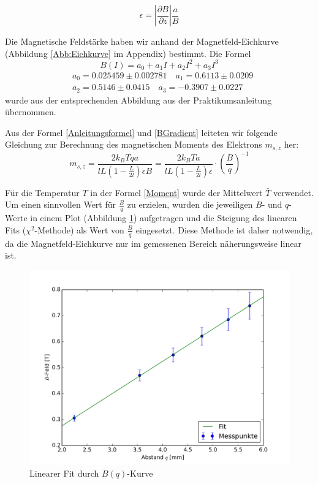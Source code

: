 \documentclass[a4paper,parskip,11pt, DIV12]{scrreprt}
\begin{document}
\begin{equation} \label{BGradient}
\epsilon = \left|\frac{\partial B}{\partial z}\right| \frac{a}{B}
\end{equation}

Die Magnetische Feldstärke haben wir anhand der Magnetfeld-Eichkurve (Abbildung \ref{Abb:Eichkurve} im Appendix) bestimmt. Die Formel \begin{equation}
B(I) = a_0 + a_1 I + a_2 I^2 + a_3 I^3
\end{equation} \begin{align*}
&a_0 = 0.025459 \pm 0.002781 \quad
a_1 = 0.6113 \pm 0.0209 \\ 
&a_2 = 0.5146 \pm 0.0415 \quad
a_3 = -0.3907 \pm 0.0227
\end{align*} wurde aus der entsprechenden Abbildung aus der Praktikumsanleitung übernommen.

Aus der Formel \ref{Anleitungsformel} und \ref{BGradient} leiteten wir folgende Gleichung zur Berechnung des magnetischen Moments des Elektrons $m_{s,z}$ her:
\begin{equation} \label{Moment}
m_{s,z}=\frac{2k_BTqa}{lL(1-\frac{L}{2l})\epsilon B} = \frac{2k_BTa}{lL(1-\frac{L}{2l})\epsilon} \cdot \left(\frac{B}{q}\right)^{-1}
\end{equation}

Für die Temperatur $T$ in der Formel \ref{Moment} wurde der Mittelwert $\bar{T}$ verwendet. Um einen sinnvollen Wert für $\frac{B}{q}$ zu erzielen, wurden die jeweiligen $B$- und $q$-Werte in einem Plot (Abbildung \ref{Abb:B/q}) aufgetragen und die Steigung des linearen Fits ($\chi^2$-Methode) als Wert von $\frac{B}{q}$ eingesetzt. Diese Methode ist daher notwendig, da die Magnetfeld-Eichkurve nur im gemessenen Bereich näherungsweise linear ist.

\begin{figure}[H]
\centering
\includegraphics[scale=0.1]{Plot}
\caption[Plot]{Linearer Fit durch $B(q)$-Kurve}
\label{Abb:B/q}
\end{figure}
\end{document}
